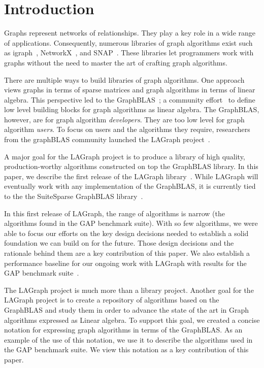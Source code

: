 \section{Introduction}
\label{sec:introduction}

Graphs represent networks of relationships. They play a key role in 
a wide range of applications.   Consequently, numerous libraries of graph algorithms exist 
such as igraph~\cite{igraph}, NetworkX~\cite{DBLP:reference/snam/X18xv}, and SNAP~\cite{DBLP:journals/tist/LeskovecS16}.
These libraries let programmers work with graphs without the need to master the art of crafting graph algorithms.

There are multiple ways to build libraries of graph algorithms.  One approach
views graphs in terms of sparse matrices and graph algorithms in terms of 
linear algebra. This perspective led to the 
GraphBLAS~\cite{DBLP:conf/hpec/MattsonBBBDFFGGHKLLPPRSWY13,DBLP:conf/hpec/MattsonYMBM17}; 
a community effort~\cite{GraphBLASforum} to define low level building blocks for graph algorithms as linear algebra.
The GraphBLAS, however, are for graph algorithm \emph{developers}.  They are too 
low level for graph algorithm \emph{users}.  To focus on users and the 
algorithms they require, researchers from the graphBLAS community launched the
LAGraph project~\cite{DBLP:conf/ipps/MattsonDKBMMY19}.  

A major goal for the LAGraph project is to produce a library 
of high quality, production-worthy algorithms constructed on top 
the GraphBLAS library.  In this paper, we describe the first release of the LAGraph library~\cite{LAGraphRepo}.
While LAGraph will eventually work with any implementation of the GraphBLAS, it is currently tied to the
the SuiteSparse GraphBLAS library~\cite{SuiteSparseGraphBLAS}.

In this first release of LAGraph, the range of algorithms is narrow (the algorithms found in the GAP benchmark suite).
With so few algorithms, we were able to focus our efforts on the key design decisions needed to establish a solid
foundation we can build on for the future.  Those design decisions 
and the rationale behind them are a key contribution of this paper.  We also establish a performance baseline for
our ongoing work with LAGraph with results for the GAP benchmark suite~\cite{DBLP:journals/corr/BeamerAP15}.

The LAGraph project is much more than a library project.   Another goal for the LAGraph project is to 
create a repository of algorithms based on the GraphBLAS and study them in order to advance the state of the art in 
Graph algorithms expressed as Linear algebra. To support this goal, we created a concise notation for expressing
graph algorithms in terms of the GraphBLAS.   As an example of the use of this notation, we use it to describe 
the algorithms used in the GAP benchmark suite.  We view this notation as a key contribution of this paper.  

